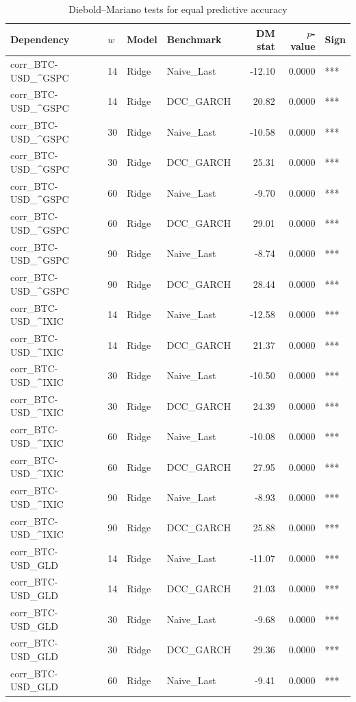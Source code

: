 \begin{table}[H]
\centering
\small
\caption{Diebold--Mariano tests for equal predictive accuracy}
\label{tab:dm_tests}
\begin{tabular}{llllrrl}
\toprule
Dependency & $w$ & Model & Benchmark & DM stat & $p$-value & Sign \\
\midrule
corr_BTC-USD_^GSPC & 14 & Ridge & Naive_Last & -12.10 & 0.0000 & *** \\
corr_BTC-USD_^GSPC & 14 & Ridge & DCC_GARCH & 20.82 & 0.0000 & *** \\
corr_BTC-USD_^GSPC & 30 & Ridge & Naive_Last & -10.58 & 0.0000 & *** \\
corr_BTC-USD_^GSPC & 30 & Ridge & DCC_GARCH & 25.31 & 0.0000 & *** \\
corr_BTC-USD_^GSPC & 60 & Ridge & Naive_Last & -9.70 & 0.0000 & *** \\
corr_BTC-USD_^GSPC & 60 & Ridge & DCC_GARCH & 29.01 & 0.0000 & *** \\
corr_BTC-USD_^GSPC & 90 & Ridge & Naive_Last & -8.74 & 0.0000 & *** \\
corr_BTC-USD_^GSPC & 90 & Ridge & DCC_GARCH & 28.44 & 0.0000 & *** \\
corr_BTC-USD_^IXIC & 14 & Ridge & Naive_Last & -12.58 & 0.0000 & *** \\
corr_BTC-USD_^IXIC & 14 & Ridge & DCC_GARCH & 21.37 & 0.0000 & *** \\
corr_BTC-USD_^IXIC & 30 & Ridge & Naive_Last & -10.50 & 0.0000 & *** \\
corr_BTC-USD_^IXIC & 30 & Ridge & DCC_GARCH & 24.39 & 0.0000 & *** \\
corr_BTC-USD_^IXIC & 60 & Ridge & Naive_Last & -10.08 & 0.0000 & *** \\
corr_BTC-USD_^IXIC & 60 & Ridge & DCC_GARCH & 27.95 & 0.0000 & *** \\
corr_BTC-USD_^IXIC & 90 & Ridge & Naive_Last & -8.93 & 0.0000 & *** \\
corr_BTC-USD_^IXIC & 90 & Ridge & DCC_GARCH & 25.88 & 0.0000 & *** \\
corr_BTC-USD_GLD & 14 & Ridge & Naive_Last & -11.07 & 0.0000 & *** \\
corr_BTC-USD_GLD & 14 & Ridge & DCC_GARCH & 21.03 & 0.0000 & *** \\
corr_BTC-USD_GLD & 30 & Ridge & Naive_Last & -9.68 & 0.0000 & *** \\
corr_BTC-USD_GLD & 30 & Ridge & DCC_GARCH & 29.36 & 0.0000 & *** \\
corr_BTC-USD_GLD & 60 & Ridge & Naive_Last & -9.41 & 0.0000 & *** \\

\end{tabular}
\end{table}
